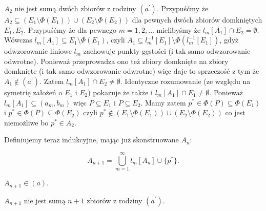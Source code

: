 \documentclass[12pt]{amsart}
\theoremstyle{plain}
\theoremstyle{definition}
\theoremstyle{remark}
\newcommand{\aideal}{\mathit{(a)}}
\newcommand{\aidealprime}{\mathit{(a^\prime)}}
\begin{document}
 $A_2$ nie jest sumą dwóch zbiorów z rodziny $\aidealprime$.
  
Przypuśćmy że $A_2 \subseteq (E_1 \setminus \Phi(E_1)) \cup (E_2 \setminus \Phi(E_2))$
dla pewnych dwóch zbiorów domkniętych $E_1, E_2$.  Przypuśćmy że dla pewnego 
$m = 1,2,\ldots$ mielibyśmy że $l_m[A_1] \cap E_2 = \emptyset$.
Wówczas $l_m[A_1] \subseteq E_1 \setminus \Phi(E_1)$, czyli 
$A_1 \subseteq l_m^{-1}[E_1] \setminus \Phi(l_m^{-1}[E_1])$, gdyż
odwzorowanie liniowe $l_m$ zachowuje punkty gęstości (i tak samo odwzorowanie odwrotne). Ponieważ 
przeprowadza ono też zbiory domknięte na zbiory domknięte (i tak samo odwzorowanie odwrotne)
więc daje to sprzeczość z tym że $A_1 \not\in \aidealprime$.
Zatem $l_m[A_1] \cap E_2 \not= \emptyset$.
Identyczne rozumowanie (ze względu na symetrię założeń o $E_1$ i $E_2$)
pokazuje że także i $l_m[A_1] \cap E_1 \not= \emptyset$.
Ponieważ $l_m[A_1] \subseteq (a_m, b_m)$
więc $P \subseteq E_1$ i $P \subseteq E_2$. 
Mamy zatem $p^* \in \Phi(P) \subseteq \Phi(E_1)$
i $p^* \in \Phi(P) \subseteq \Phi(E_2)$
czyli $p^* \not\in (E_1 \setminus \Phi(E_1)) \cup (E_2 \setminus \Phi(E_2))$
co jest niemożliwe bo $p^* \in A_2$.

\smallskip

Definiujemy teraz indukcyjne, mając już skonstruowane $A_n$:

\[ A_{n + 1} = \bigcup_{m=1}^{\infty} l_m[A_n] \cup \lbrace p^* \rbrace.
\]

 $A_{n+1} \in \aideal$.
  

 $A_{n+1}$ nie jest sumą $n + 1$ zbiorów z rodziny $\aidealprime$.
  
\end{document}

